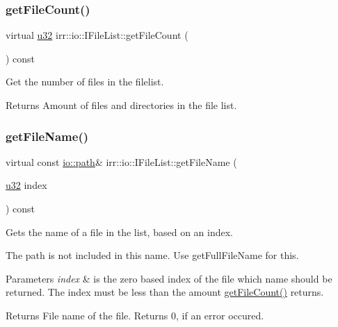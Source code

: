 \subsubsection{\texorpdfstring{get\+File\+Count()}{getFileCount()}}
{\footnotesize\ttfamily virtual \hyperlink{namespaceirr_a0416a53257075833e7002efd0a18e804}{u32} irr\+::io\+::\+I\+File\+List\+::get\+File\+Count (\begin{DoxyParamCaption}{ }\end{DoxyParamCaption}) const\hspace{0.3cm}{\ttfamily [pure virtual]}}



Get the number of files in the filelist. 

\begin{DoxyReturn}{Returns}
Amount of files and directories in the file list. 
\end{DoxyReturn}
\mbox{\label{classirr_1_1io_1_1IFileList_ab4e0330adf34afa3c21e06ff0b4e84d5}} 
\subsubsection{\texorpdfstring{get\+File\+Name()}{getFileName()}}
{\footnotesize\ttfamily virtual const \hyperlink{namespaceirr_1_1io_ab1bdc45edb3f94d8319c02bc0f840ee1}{io\+::path}\& irr\+::io\+::\+I\+File\+List\+::get\+File\+Name (\begin{DoxyParamCaption}\item[{\hyperlink{namespaceirr_a0416a53257075833e7002efd0a18e804}{u32}}]{index }\end{DoxyParamCaption}) const\hspace{0.3cm}{\ttfamily [pure virtual]}}



Gets the name of a file in the list, based on an index. 

The path is not included in this name. Use get\+Full\+File\+Name for this. 
\begin{DoxyParams}{Parameters}
{\em index} & is the zero based index of the file which name should be returned. The index must be less than the amount \hyperlink{classirr_1_1io_1_1IFileList_a871861be76e18d58274c4580b1d103b9}{get\+File\+Count()} returns. \\
\hline
\end{DoxyParams}
\begin{DoxyReturn}{Returns}
File name of the file. Returns 0, if an error occured. 
\end{DoxyReturn}
\mbox{\label{classirr_1_1io_1_1IFileList_a97582a2cf5c05e7b8dcb702384ab76bd}} 
